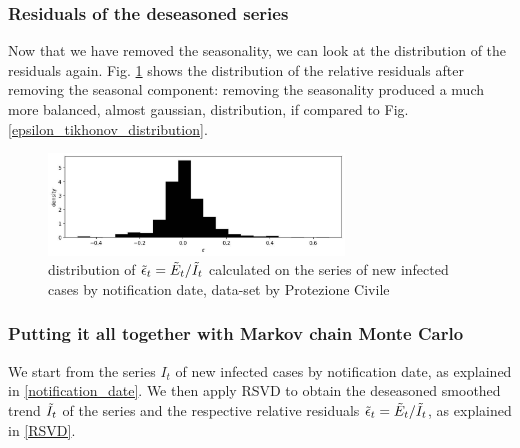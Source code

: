 \documentclass[graybox]{svmult}
\begin{document}
\subsubsection{Residuals of the deseasoned series}

Now that we have removed the seasonality, we can look at the distribution of the residuals again. Fig. \ref{epsilon_RSVD_distribution} shows the distribution of the relative residuals after removing the seasonal component: removing the seasonality produced a much more balanced, almost gaussian, distribution, if compared to Fig. \ref{epsilon_tikhonov_distribution}.

\begin{figure}[t]
\center
\includegraphics[width=0.7\textwidth]{Rt_images/epsilon_RSVD_distribution.jpg}
\caption{distribution of $\Tilde{\epsilon}_t = \Tilde{E}_t/\Tilde{I}_t$ calculated on the series of new infected cases by notification date, data-set by Protezione Civile}
\label{epsilon_RSVD_distribution}
\end{figure}

\subsubsection{Putting it all together with Markov chain Monte Carlo}

We start from the series $I_t$ of new infected cases by notification date, as explained in \ref{notification_date}. We then apply RSVD to obtain the deseasoned smoothed trend $\Tilde{I}_t$ of the series and the respective relative residuals $\Tilde{\epsilon}_t = \Tilde{E}_t/\Tilde{I}_t$, as explained in \ref{RSVD}. 
\end{document}
